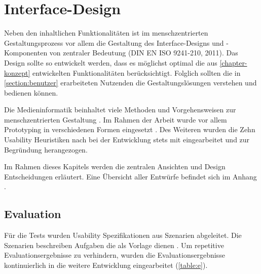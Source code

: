 \chapter{Interface-Design}
\label{chapter-design}
Neben den inhaltlichen Funktionalitäten ist im menschzentrierten Gestaltungsprozess vor allem die
Gestaltung des Interface-Designs und -Komponenten von zentraler Bedeutung (DIN EN ISO 9241-210,
2011). Das Design sollte so entwickelt werden, dass es möglichst optimal die aus
\ref{chapter-konzept} entwickelten Funktionalitäten berücksichtigt. Folglich sollten die in
\ref{section:benutzer} erarbeiteten Nutzenden die Gestaltungslösungen verstehen und bedienen können.

Die Medieninformatik beinhaltet viele Methoden und Vorgehensweisen zur menschzentrierten Gestaltung
. Im Rahmen der Arbeit wurde vor allem Prototyping in verschiedenen Formen
eingesetzt . Des Weiteren wurden die Zehn Usability Heuristiken nach
 bei der Entwicklung stets mit eingearbeitet und zur Begründung
herangezogen.

Im Rahmen dieses Kapitels werden die zentralen Ansichten und Design Entscheidungen erläutert. Eine
Übersicht aller Entwürfe befindet sich im Anhang .

\section{Evaluation}
Für die Tests wurden Usability Spezifikationen aus Szenarien abgeleitet. Die Szenarien beschreiben
Aufgaben die als Vorlage dienen . Um repetitive Evaluationsergebnisse zu verhindern, wurden die
Evaluationsergebnisse kontinuierlich in die weitere Entwicklung eingearbeitet (\ref{table:e}).

